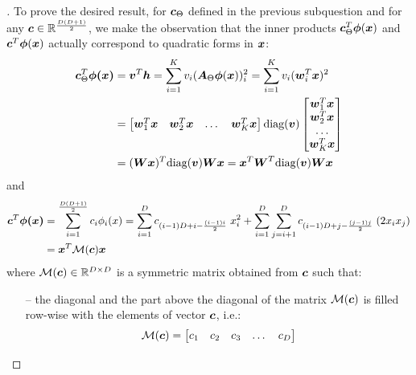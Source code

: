 \documentclass{exam}
\begin{document}
\begin{questions}
        \question
        \begin{proof}[\unskip\nopunct]
        To prove the desired result, for $\vb*{c}_{\Theta}$ defined in the previous subquestion and for any $\vb*{c} \in \mathbb{R}^{\frac{D(D + 1)}{2}}$, we make the observation that the inner products $\vb*{c}_{\Theta}^T  \vb*{\phi}(\vb*{x})$ and $\vb*{c}^T  \vb*{\phi}(\vb*{x})$ actually correspond to quadratic forms in $\vb*{x}$:
        \begin{align*}
            \vb*{c}_{\Theta}^T \vb*{\phi(x)} &= \vb*{v}^T \vb*{h} = \sum_{i = 1}^K v_i (\vb*{A}_{\Theta} \vb*{\phi}(\vb*{x}))^2_i = 
            \sum_{i = 1}^K v_i (\vb*{w}_i^T \vb*{x})^2 \\
            &= 
            \begin{bmatrix}
                \vb*{w}_1^T \vb*{x} & \vb*{w}_2^T \vb*{x} & \dots & \vb*{w}_K^T \vb*{x}
            \end{bmatrix}
            \text{diag}(\vb*{v})
            \begin{bmatrix}
                \vb*{w}_1^T \vb*{x} \\ \vb*{w}_2^T \vb*{x} \\ \dots \\ \vb*{w}_K^T \vb*{x}
            \end{bmatrix} \\
            &= (\vb*{Wx})^T \text{diag}(\vb*{v}) \vb*{Wx} 
             = \vb*{x}^T \vb*{W}^T \text{diag}(\vb*{v}) \vb*{Wx} 
        \end{align*}
        and 
        \begin{align*}
            \vb*{c}^T \vb*{\phi(x)} &= \sum_{i = 1}^{\frac{D(D + 1)}{2}} c_i \phi_i(x) = \sum_{i = 1}^{D} c_{(i - 1)D + i - \frac{(i - 1)i}{2}}\; x_i^2 + \sum_{i = 1}^{D}\sum_{j = i + 1}^{D} c_{(i - 1)D + j - \frac{(j - 1)j}{2}}\;(2 x_i x_j) \\
            &= \vb*{x}^T \mathcal{M}(\vb*{c}) \vb*{x}
        \end{align*}
        where $\mathcal{M}(\vb*{c}) \in \mathbb{R}^{D \times D}$ is a symmetric matrix obtained from $\vb*{c}$ such that:
        \begin{itemize}
            \item[--] the diagonal and the part above the diagonal of the matrix $\mathcal{M}(\vb*{c})$ is filled row-wise with the elements of vector $\vb*{c}$, i.e.:
            \[
                \mathcal{M}(\vb*{c}) = 
                \begin{bmatrix}
                    c_1 & c_2 & c_3 & \dots & c_D \\

\end{bmatrix}\]
\end{itemize}
\end{proof}
\end{questions}
\end{document}

